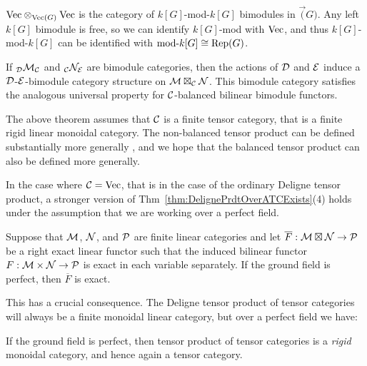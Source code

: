 \documentclass{amsart}
\begin{document}
\begin{example}
$\Vec \otimes_{\Vec(G)} \Vec$ is the category of $k[G]$-mod-$k[G]$ bimodules in $\Vec(G)$. Any left $k[G]$ bimodule is free, so we can identify $k[G]$-mod with $\Vec$, and thus $k[G]$-mod-$k[G]$ can be identified with $\text{mod-}k[G] \cong \Rep(G)$.
\end{example}

\begin{remark}
	If ${}_{\cD}\cM_{\cC}$ and ${}_{\cC}\cN_{\cE}$ are bimodule categories, then the actions of $\cD$ and $\cE$ induce a $\cD$-$\cE$-bimodule category structure on $\cM \boxtimes_{\cC} \cN$. This bimodule category satisfies the analogous universal property for $\cC$-balanced bilinear bimodule functors.
\end{remark}

\begin{remark}
The above theorem assumes that $\cC$ is a finite tensor category, that is a finite rigid linear monoidal category.  The non-balanced tensor product can be defined substantially more generally \cite{1212.1545}, and we hope that the balanced tensor product can also be defined more generally.
\end{remark}

In the case where $\cC = \Vec$, that is in the case of the ordinary Deligne tensor product, a stronger version of Thm~\ref{thm:DelignePrdtOverATCExists}(4) holds under the assumption that we are working over a perfect field.

\begin{lemma}[{\cite[Pr.~5.13(vi)]{MR1106898}}]%
	Suppose that $\cM$, $\cN$, and $\cP$ are finite linear categories and let $\overline{F}: \cM \boxtimes \cN \to \cP$ be a right exact linear functor such that the induced bilinear functor $F: \cM \times \cN \to \cP$ is exact in each variable separately. If the ground field is perfect, then $\overline{F}$ is exact. 
\end{lemma}

This has a crucial consequence. The Deligne tensor product of tensor categories will always be a finite monoidal linear category, but over a perfect field we have:

\begin{corollary}[{\cite[Pr.~5.17]{MR1106898}}]%
	If the ground field is perfect, then tensor product of tensor categories is a {\em rigid} monoidal category, and hence again a tensor category. 
\end{corollary}
\end{document}
